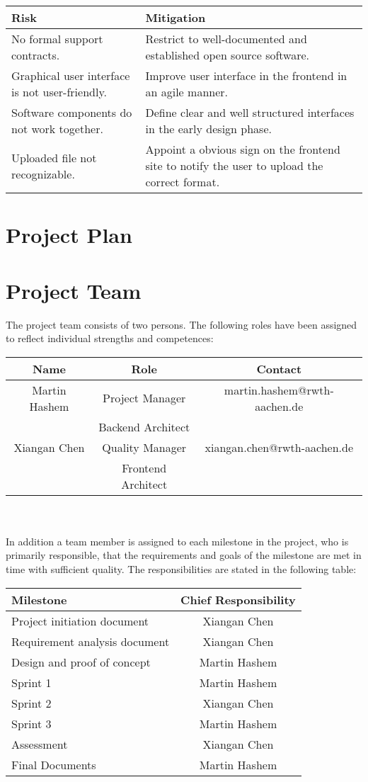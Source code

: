 \documentclass[runningheads]{llncs}
\begin{document}
\renewcommand\arraystretch{1.5}
\begin{tabular}{p{5cm}|p{6cm}}
	Risk& Mitigation\\
	\hline
	No formal support contracts.& Restrict to well-documented and established open
	source software.\\
	\hline
	Graphical user interface is not user-friendly.& Improve user interface in the frontend in an agile manner.\\
	\hline
	Software components do not work together.& Define clear and well structured interfaces in the early design phase.\\
	\hline
	Uploaded file not recognizable.& Appoint a obvious sign on the frontend site to notify the user to upload the correct format.\\
\end{tabular}

\section{Project Plan}
\section{Project Team}
The project team consists of two persons. The following roles have been assigned to reflect individual strengths and competences:\\


\renewcommand\arraystretch{2}
\begin{tabular}{c|cc}
	Name& Role& Contact\\
	\hline
	Martin Hashem& Project Manager& martin.hashem@rwth-aachen.de\\
	& Backend Architect& \\ 
	Xiangan Chen& Quality Manager& xiangan.chen@rwth-aachen.de\\
	& Frontend Architect & \\
\end{tabular}
\\\\[2pt]
In addition a team member is assigned to each milestone in the project, who is primarily
responsible, that the requirements and goals of the milestone are met in time with sufficient quality. The responsibilities are stated in the following table:\\

\begin{tabular}{lc}
	Milestone& Chief Responsibility\\
	\hline
	Project initiation document& Xiangan Chen\\
	Requirement analysis document& Xiangan Chen\\
	Design and proof of concept& Martin Hashem\\
	Sprint 1& Martin Hashem\\
	Sprint 2& Xiangan Chen\\
	Sprint 3& Martin Hashem\\
	Assessment& Xiangan Chen\\
	Final Documents& Martin Hashem\\
\end{tabular}




\end{document}
